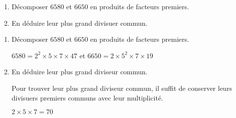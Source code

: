 \begin{exercice*}
    \begin{enumerate}
        \item Décomposer $\num{6580}$ et $\num{6650}$ en produits de facteurs premiers.
        \item En déduire leur plus grand divisuer commun.
    \end{enumerate}    
\end{exercice*}
\begin{corrige}
    \begin{enumerate}
        \item Décomposer $\num{6580}$ et $\num{6650}$ en produits de facteurs premiers.
        
        $\num{6580}=2^2\times 5\times 7\times 47$ et $\num{6650}=2\times 5^2\times 7\times 19$
        \item En déduire leur plus grand diviseur commun.
        
        Pour trouver leur plus grand diviseur commun, il suffit de conserver leurs divisuers premiers communs avec leur multiplicité.

        $2\times 5\times 7 = 70$        
    \end{enumerate}
\end{corrige}

